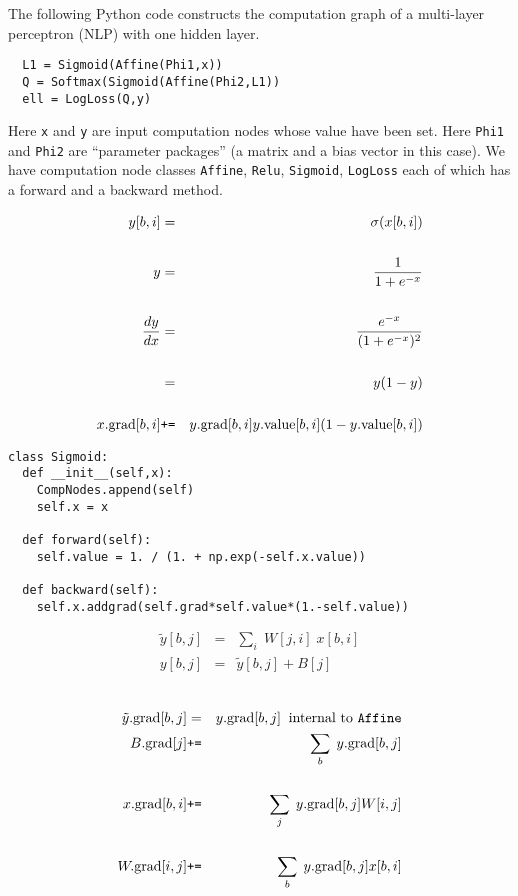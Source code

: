 {
\medskip

The following Python code constructs the computation graph of a multi-layer perceptron (NLP) with one hidden layer.

\vfill
\begin{verbatim}
  L1 = Sigmoid(Affine(Phi1,x))
  Q = Softmax(Sigmoid(Affine(Phi2,L1))
  ell = LogLoss(Q,y)
\end{verbatim}

\vfill
Here {\tt x} and {\tt y} are input computation nodes
whose value have been set.
Here {\tt Phi1} and {\tt Phi2} are ``parameter packages'' (a matrix and a bias vector in this case).
We have computation node classes {\tt Affine}, {\tt Relu}, {\tt Sigmoid}, {\tt LogLoss} each of which has
a forward and a backward method.


\begin{eqnarray*}
y[b,i] & = &  \sigma(x[b,i]) \\
\\
y & = & \frac{1}{1 + e^{-x}} \\
\\
\frac{d y}{dx} & = & \frac{e^{-x}}{(1 + e^{-x})^2} \\
\\
& = & y(1-y) \\
\\
x.\mathrm{grad}[b,i] & \mbox{\tt +=} & y.\mathrm{grad}[b,i]y.\mathrm{value}[b,i](1-y.\mathrm{value}[b,i])
\end{eqnarray*}




\begin{verbatim}
class Sigmoid:
  def __init__(self,x):
    CompNodes.append(self)
    self.x = x

  def forward(self):
    self.value = 1. / (1. + np.exp(-self.x.value))

  def backward(self):
    self.x.addgrad(self.grad*self.value*(1.-self.value))
\end{verbatim}


\vspace{-3ex}
\begin{eqnarray*}
  \tilde{y}[b,j] & = & \sum_i\;W[j,i]\;x[b,i] \\
  y[b,j] & = & \tilde{y}[b,j] + B[j]
  \end{eqnarray*}

\vspace{-4ex}
{\color{red}
\begin{eqnarray*}
  \\
  \tilde{y}.\mathrm{grad}[b,j] & = & y.\mathrm{grad}[b,j]\;\;\mbox{\color{black} internal to {\tt Affine}} \\
  B.\mathrm{grad}[j] & \mbox{\tt +=} & \sum_b\;y.\mathrm{grad}[b,j] \\
  \\
  x.\mathrm{grad}[b,i] & \mbox{\tt +=} & \sum_j\;y.\mathrm{grad}[b,j]W[i,j] \\
  \\
  W.\mathrm{grad}[i,j] & \mbox{\tt +=} & \sum_b\;y.\mathrm{grad}[b,j]x[b,i]
\end{eqnarray*}
}

}
